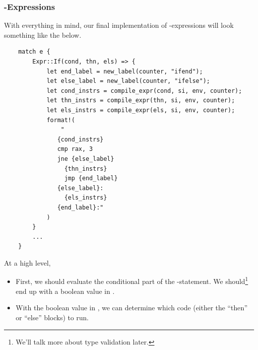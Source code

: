 \documentclass[letterpaper]{article}
\begin{document}
\subsubsection{-Expressions}
With everything in mind, our final implementation of -expressions will look something like the below.
\begin{verbatim}
    match e {
        Expr::If(cond, thn, els) => {
            let end_label = new_label(counter, "ifend");
            let else_label = new_label(counter, "ifelse");
            let cond_instrs = compile_expr(cond, si, env, counter);
            let thn_instrs = compile_expr(thn, si, env, counter);
            let els_instrs = compile_expr(els, si, env, counter);
            format!(
                "
               {cond_instrs}
               cmp rax, 3
               jne {else_label}
                 {thn_instrs}
                 jmp {end_label}
               {else_label}:
                 {els_instrs}
               {end_label}:"
            )
        }
        ... 
    }\end{verbatim}
At a high level, 
\begin{itemize}
    \item First, we should evaluate the conditional part of the -statement. We should\footnote{We'll talk more about type validation later.} end up with a boolean value in . 
    \item With the boolean value in , we can determine which code (either the ``then'' or ``else'' blocks) to run. 
\end{itemize}
\end{document}
